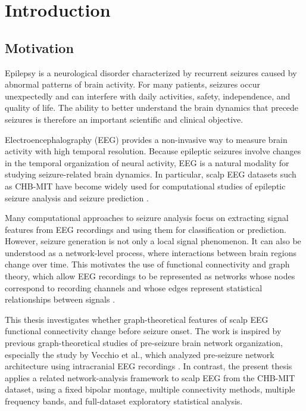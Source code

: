 \chapter{Introduction}
\label{chap:introduction}

\section{Motivation}
\label{sec:introduction-motivation}

Epilepsy is a neurological disorder characterized by recurrent seizures caused
by abnormal patterns of brain activity. For many patients, seizures occur
unexpectedly and can interfere with daily activities, safety, independence, and
quality of life. The ability to better understand the brain dynamics that
precede seizures is therefore an important scientific and clinical objective.

Electroencephalography (EEG) provides a non-invasive way to measure brain
activity with high temporal resolution. Because epileptic seizures involve
changes in the temporal organization of neural activity, EEG is a natural
modality for studying seizure-related brain dynamics. In particular, scalp EEG
datasets such as CHB-MIT have become widely used for computational studies of
epileptic seizure analysis and seizure prediction \cite{Tsiouris2018}.

Many computational approaches to seizure analysis focus on extracting signal
features from EEG recordings and using them for classification or prediction.
However, seizure generation is not only a local signal phenomenon. It can also
be understood as a network-level process, where interactions between brain
regions change over time. This motivates the use of functional connectivity and
graph theory, which allow EEG recordings to be represented as networks whose
nodes correspond to recording channels and whose edges represent statistical
relationships between signals \cite{Friston1994,Rubinov2010}.

This thesis investigates whether graph-theoretical features of scalp EEG
functional connectivity change before seizure onset. The work is inspired by
previous graph-theoretical studies of pre-seizure brain network organization,
especially the study by Vecchio et al., which analyzed pre-seizure network
architecture using intracranial EEG recordings \cite{Vecchio2016}. In contrast,
the present thesis applies a related network-analysis framework to scalp EEG
from the CHB-MIT dataset, using a fixed bipolar montage, multiple connectivity
methods, multiple frequency bands, and full-dataset exploratory statistical
analysis.

